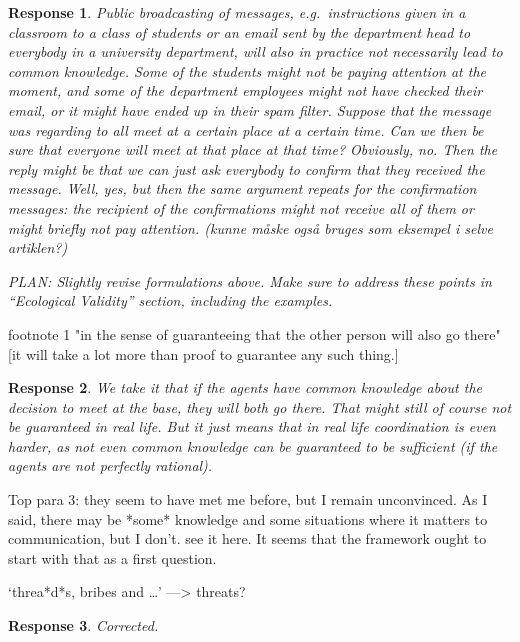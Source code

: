 \documentclass[a4paper]{article}
\newtheorem{response}{Response}
\begin{document}
\begin{response}
Public broadcasting of messages, e.g.\ instructions given in a classroom to a class of students or an email sent by the department head to everybody in a university department, will also in practice not necessarily lead to common knowledge. Some of the students might not be paying attention at the moment, and some of the department employees might not have checked their email, or it might have ended up in their spam filter. Suppose that the message was regarding to all meet at a certain place at a certain time. Can we then be sure that everyone will meet at that place at that time? Obviously, no. Then the reply might be that we can just ask everybody to confirm that they received the message. Well, yes, but then the same argument repeats for the confirmation messages: the recipient of the confirmations might not receive all of them or might briefly not pay attention. (kunne måske også bruges som eksempel i selve artiklen?)

PLAN: Slightly revise formulations above. Make sure to address these points in ``Ecological Validity'' section, including the examples.
\end{response}

footnote 1 "in the sense of guaranteeing that the other person will also go there" [it will take a lot more than proof to guarantee any such thing.]

\begin{response}
We take it that if the agents have common knowledge about the decision to meet at the base, they \emph{will} both go there. That might still of course not be guaranteed in real life. But it just means that in real life coordination is even harder, as not even common knowledge can be guaranteed to be sufficient (if the agents are not perfectly rational).
\end{response}


Top para 3: they seem to have met me before, but I remain unconvinced. As I said, there may be *some* knowledge and some situations where it matters to communication, but I don't. see it here. It seems that the framework ought to start with that as a first question.


`threa*d*s, bribes and …' —> threats?
\begin{response} Corrected. \end{response}
\end{document}
